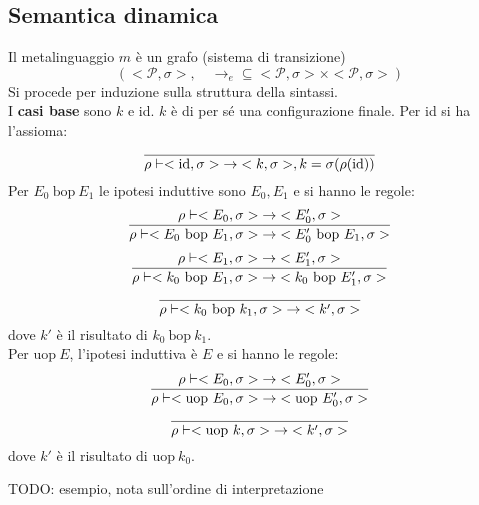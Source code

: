 \documentclass[a4paper]{report}
\newcommand{\prop}{\mathcal{P}}
\newcommand{\bop}{\ \mathrm{bop}\ }
\newcommand{\uop}{\mathrm{uop}\ }
\theoremstyle{definition} \newtheorem*{defi}{Def}
\theoremstyle{plain} \newtheorem{lemma}{Lemma}
\theoremstyle{plain} \newtheorem{teo}{Teorema}
\theoremstyle{remark} \newtheorem*{es}{Esempio}
\DeclareRobustCommand{\frac}[3][0pt]{%
  {\begingroup\hspace{#1}#2\hspace{#1}\endgroup\over\hspace{#1}#3\hspace{#1}}}
\begin{document}
\subsection{Semantica dinamica}
Il metalinguaggio $m$ è un grafo (sistema di transizione)
\[(<\prop, \sigma>,\quad \mathbin{\rightarrow}_e \subseteq <\prop, \sigma> \times <\prop, \sigma>)\]
Si procede per induzione sulla struttura della sintassi.\\
I {\bf casi base} sono $k$ e id. $k$ è di per s\'e una configurazione finale.
Per id si ha l'assioma:
\begin{equation}
  \frac{}{\rho \vdash <\mathrm{id}, \sigma> \mathbin{\rightarrow} <k,\sigma>, k=\sigma(\rho(\mathrm{id}))}
\end{equation}
Per $E_0 \bop E_1$ le ipotesi induttive sono $E_0, E_1$ e si hanno le regole:
\begin{equation}
  \frac{
    \rho \vdash <E_0,\sigma> \mathbin{\rightarrow} <E_0',\sigma>
  }{
    \rho \vdash <E_0 \bop E_1,\sigma> \mathbin{\rightarrow} <E_0' \bop E_1,\sigma>
  }
\end{equation}
\begin{equation}
  \frac{
    \rho \vdash <E_1,\sigma> \mathbin{\rightarrow} <E_1',\sigma>
  }{
    \rho \vdash <k_0 \bop E_1,\sigma> \mathbin{\rightarrow} <k_0 \bop E_1',\sigma>
  }
\end{equation}
\begin{equation}
  \frac{}{
  \rho \vdash <k_0 \bop k_1,\sigma> \mathbin{\rightarrow} <k',\sigma>
  }
\end{equation}
dove $k'$ è il risultato di $k_0 \bop k_1$.\\
Per $\uop E$, l'ipotesi induttiva è $E$ e si hanno le regole:
\begin{equation}
  \frac{
    \rho \vdash <E_0,\sigma> \mathbin{\rightarrow} <E_0',\sigma>
  }{
    \rho \vdash <\uop E_0,\sigma> \mathbin{\rightarrow} <\uop E_0',\sigma>
  }
\end{equation}
\begin{equation}
  \frac{}{
  \rho \vdash <\uop k,\sigma> \mathbin{\rightarrow} <k',\sigma>
  }
\end{equation}
dove $k'$ è il risultato di $\uop k_0$.

TODO: esempio, nota sull'ordine di interpretazione
\end{document}
